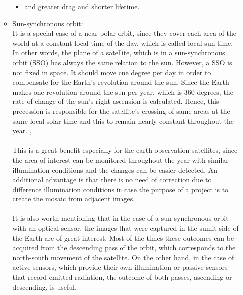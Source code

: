\begin{itemize}
\begin{itemize}
\begin{itemize}
		\item and greater drag and shorter lifetime.
		\end{itemize}
	\item Sun-synchronous orbit: \\
	It is a special case of a near-polar orbit, since they cover each area of the world at a constant local time of the day, which is called local sun time. In other words, the plane of a satellite, which is in a sun-synchronous orbit (SSO) has always the same relation to the sun. However, a SSO is not fixed in space. It should move one degree per day in order to compensate for the Earth's revolution around the sun. Since the Earth makes one revolution around the sun per year, which is 360 degrees, the rate of change of the sun's right ascension is calculated. Hence, this precession is responsible for the satellite's crossing of same areas at the same local solar time and this to remain nearly constant throughout the year. \cite{Meseguer}, \cite{Kramer 2002} \\ %
	\\
	This is a great benefit especially for the earth observation satellites, since the area of interest can be monitored throughout the year with similar illumination conditions and the changes can be easier detected. An additional advantage is that there is no need of correction due to difference illumination conditions in case the purpose of a project is to create the mosaic from adjacent images. \\
	\\
	It is also worth mentioning that in the case of a sun-synchronous orbit with an optical sensor, the images that were captured in the sunlit side of the Earth are of great interest. Most of the times these outcomes can be acquired from the descending pass of the orbit, which corresponds to the north-south movement of the satellite. On the other hand, in the case of active sensors, which provide their own illumination or passive sensors that record emitted radiation, the outcome of both passes, ascending or descending, is useful. \cite{Campbell}
	\end{itemize}
\end{itemize}


